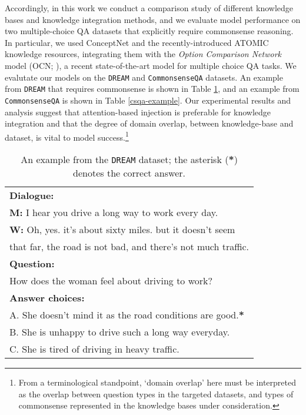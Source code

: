 \documentclass[11pt,a4paper]{article}
\begin{document}
Accordingly, in this work we conduct a comparison study of different knowledge bases and knowledge integration methods, and we evaluate model performance on two multiple-choice QA datasets that explicitly require commonsense reasoning. In particular, we used ConceptNet \cite{speer2016conceptnet} and the recently-introduced ATOMIC \cite{sap2019atomic} knowledge resources, integrating them with the \textit{Option Comparison Network} model (OCN; \citet{DBLP:journals/corr/abs-1903-03033}), a recent state-of-the-art model for multiple choice QA tasks. We evalutate our models on the \texttt{DREAM} \cite{TACL1534} and \texttt{CommonsenseQA} \cite{talmor-etal-2019-commonsenseqa} datasets. An example from \texttt{DREAM} that requires commonsense is shown in Table \ref{dream-example}, and an example from \texttt{CommonsenseQA} is shown in Table \ref{csqa-example}. Our experimental results and analysis suggest that attention-based injection is preferable for knowledge integration and that the degree of domain overlap, between knowledge-base and dataset, is vital to model success.\footnote{From a terminological standpoint, `domain overlap' here must be interpreted as the overlap between question types in the targeted datasets, and types of commonsense represented in the knowledge bases under consideration.} 


\begin{table}[h]
\footnotesize
\begin{center}
\begin{tabular}{|l|}
\hline \bf Dialogue: \\ 
\textbf{M:} I hear you drive a long way to work every day. \\
\textbf{W:} Oh, yes. it's about sixty miles. but it doesn't seem \\ 
that far, the road is not bad, and there's not much traffic.\\
\textbf{Question:} \\
How does the woman feel about driving to work? \\
\textbf{Answer choices:}\\ 
A. She doesn't mind it as the road conditions are good.\textbf{*} \\
B. She is unhappy to drive such a long way everyday.\\
C. She is tired of driving in heavy traffic. \\
\hline
\end{tabular}
\end{center}
\caption{An example from the \texttt{DREAM} dataset; the asterisk (\textbf{*}) denotes the correct answer.}
\label{dream-example}
\end{table}
\end{document}
